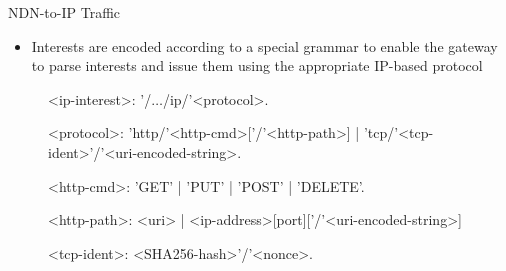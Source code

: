 \documentclass[handout]{beamer}
\begin{document}
\begin{frame}{NDN-to-IP Traffic}
\begin{itemize}
	\item Interests are encoded according to a special grammar to enable the gateway to parse interests and issue them using the appropriate IP-based protocol
\end{itemize}


\begin{figure}
\begin{mdframed}
\begingrammar
\noindent
<ip-interest>:	'/$\dots$/ip/'<protocol>.

<protocol>:	'http/'<http-cmd>[{'/'<http-path>}] | 'tcp/'<tcp-ident>'/'<uri-encoded-string>. 

<http-cmd>: 'GET' | 'PUT' | 'POST' | 'DELETE'.


<http-path>: <uri> | <ip-address>[port]['/'<uri-encoded-string>]

<tcp-ident>: <SHA256-hash>'/'<nonce>. %





		
\endgrammar
\end{mdframed}
\end{figure}

\end{frame}
\end{document}

